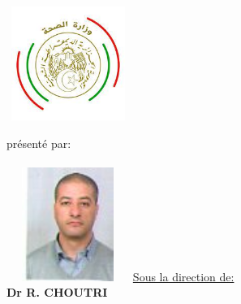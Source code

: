 \thispagestyle{empty}
	\begin{center}
		\vfill
		
		\vfill
		\large{\textbf{
		\normalsize{\radp}      \\
		\normalsize{\ms}        \\
		\vfill
		\normalsize{\ispg}\\
		\normalsize{\ispr}\\
		}}
		\vfill
		\includegraphics[width=4cm,height=3.7cm]{img/msp.jpg}
		\vfill

		
		\vfill
		
		\large{présenté par:}\\
		\textbf{
		        \np \\
				    }
		\vfill
		\includegraphics[width=4cm,height=3.7cm]{img/redha.jpg}
		\vfill
		\underline{Sous la direction de:}\\
		\textbf {Dr R. CHOUTRI}
		\vfill
	\end{center}

